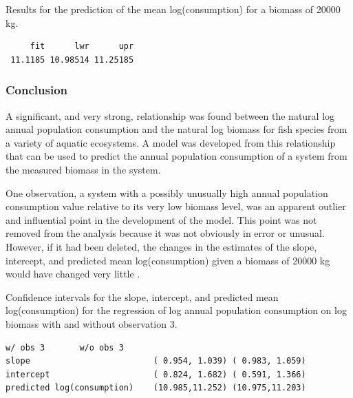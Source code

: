 \documentclass[10pt,openany]{book}\usepackage[]{graphicx}\usepackage[]{color}
\makeatletter
\newenvironment{kframe}{%
 \def\at@end@of@kframe{}%
 \ifinner\ifhmode%
  \def\at@end@of@kframe{\end{minipage}}%
  \begin{minipage}{\columnwidth}%
 \fi\fi%
 \def\FrameCommand##1{\hskip\@totalleftmargin \hskip-\fboxsep
 \colorbox{shadecolor}{##1}\hskip-\fboxsep
     \hskip-\linewidth \hskip-\@totalleftmargin \hskip\columnwidth}%
 \MakeFramed {\advance\hsize-\width
   \@totalleftmargin\z@ \linewidth\hsize
   \@setminipage}}%
 {\par\unskip\endMakeFramed%
 \at@end@of@kframe}
\newenvironment{knitrout}{}{} %
\makeatother
\begin{document}
\begin{table}[h]
  \centering
  \caption{Results for the prediction of the mean log(consumption) for a biomass of 20000 kg.}\label{tab:SLRFCPred}
\begin{knitrout}
\color{fgcolor}\begin{kframe}
\begin{verbatim}
     fit      lwr      upr
 11.1185 10.98514 11.25185
\end{verbatim}
\end{kframe}
\end{knitrout}
\end{table}

\subsubsection*{Conclusion}
A significant, and very strong, relationship was found between the natural log annual population consumption and the natural log biomass for fish species from a variety of aquatic ecosystems.  A model was developed from this relationship that can be used to predict the annual population consumption of a system from the measured biomass in the system.

One observation, a system with a possibly unusually high annual population consumption value relative to its very low biomass level, was an apparent outlier and influential point in the development of the model.  This point was not removed from the analysis because it was not obviously in error or unusual.  However, if it had been deleted, the changes in the estimates of the slope, intercept, and predicted mean log(consumption) given a biomass of 20000 kg would have changed very little .

\begin{table}[h]
  \centering
  \caption{Confidence intervals for the slope, intercept, and predicted mean log(consumption) for the regression of log annual population consumption on log biomass with and without observation 3.}\label{tab:SLRFCOutlier}
  \begin{Verbatim}[xleftmargin=5mm]
                                     w/ obs 3       w/o obs 3
slope                         ( 0.954, 1.039) ( 0.983, 1.059)
intercept                     ( 0.824, 1.682) ( 0.591, 1.366)
predicted log(consumption)    (10.985,11.252) (10.975,11.203)
  \end{Verbatim}
\end{table}
\end{document}
